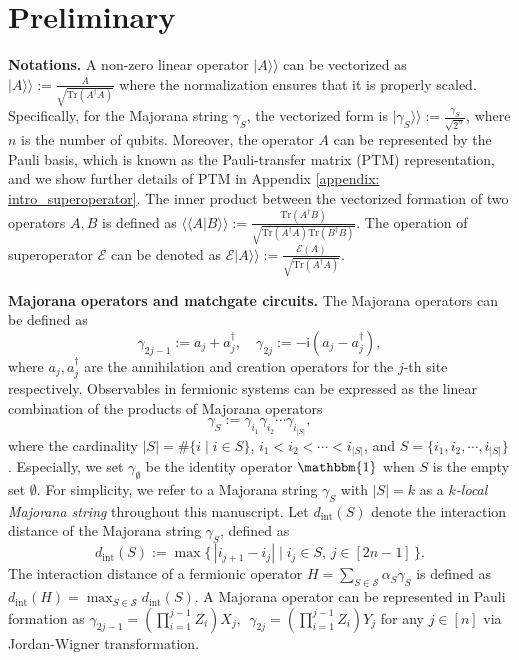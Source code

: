 \documentclass[showpacs,twocolumn,aps,prx,long bibliography,superscriptaddress,notitlepage]{revtex4-1}
\newcommand{\ii}{\mathsf{i}}
\newcommand{\supket}[1]{|#1 \rangle\rangle}
\newcommand{\cbra}[1]{\{ #1 \}}
\newcommand{\supbraket}[1]{\langle\langle #1 \rangle\rangle}
\newcommand{\tra}[1]{\text{Tr}\left( #1 \right)}
\newcommand{\Ecal}{\mathcal{E}}
\newcommand{\Scal}{\mathcal{S}}
\begin{document}
\section{Preliminary}
\label{sec: preliminary}
\noindent\textbf{Notations.} 
 A non-zero linear operator $\supket{A}$ can be vectorized as $\supket{A}:=\frac{A}{\sqrt{\tra{A^\dagger A}}}$ where the normalization ensures that it is properly scaled. 
Specifically, for the Majorana string
$\gamma_S$, the vectorized form is
$\supket{\gamma_S}:=\frac{\gamma_S}{\sqrt{2^n}}$, where $n$ is the number of qubits. Moreover, the operator $A$ can be represented by the Pauli basis, which is known as the Pauli-transfer matrix (PTM) representation, and we show further details of PTM in Appendix \ref{appendix: intro_superoperator}. 
The inner product between the vectorized formation of two operators $A,B$ is defined as $\supbraket{A|B} :=\frac{\tra{A^\dagger B}}{\sqrt{\tra{A^\dagger A} \tra{B^\dagger B}}}$. The operation of superoperator $\Ecal$ can be denoted as $\Ecal\supket{A}:=\frac{\Ecal(A)}{\sqrt{\tra{A^\dagger A}}}$. 


\vspace{8pt}
\noindent\textbf{Majorana operators and matchgate circuits.}
The Majorana operators can be defined as 
\begin{equation}
    \gamma_{2 j-1}:=a_j+a_j^{\dagger}, \quad \gamma_{2 j}:=-\ii\left(a_j-a_j^{\dagger}\right),
    \label{eq: standard Majorana operators}
\end{equation}
where $a_j,a_j^\dagger$ are the annihilation and creation operators for the $j$-th site respectively. 
Observables in fermionic systems can be expressed as the linear combination of the products of Majorana operators~\cite{hackl2021bosonic}
\begin{equation}
    \gamma_S := \gamma_{i_1}\gamma_{i_2}\cdots\gamma_{i_{|S|}},
    \label{eq: gammaS}
\end{equation}
where the cardinality $|S|=\#\cbra{i \mid i\in S}$,  $i_1 < {i_2}< \cdots < i_{|S|}$, and $S = \{i_1 , {i_2}, \cdots , i_{|S|}\}$. Especially, we set $\gamma_\emptyset$ be the identity operator $\mathbbm{1}$ when $S$ is the empty set $\emptyset$. For simplicity, we refer to a Majorana string $\gamma_S$ with $|S| = k$ as a \emph{$k$-local Majorana string} throughout this manuscript.
Let $d_{\text{int}}(S)$ denote the interaction distance of the Majorana string $\gamma_S$, defined as
\begin{equation}
\label{eq: dint def}
d_{\text{int}}(S) := \max\{\,|i_{j+1} - i_{j}| \mid i_j \in S,\, j \in [2n-1]\,\}.
\end{equation}
The interaction distance of a fermionic operator $H = \sum_{S\in\Scal} \alpha_{S} \gamma_{S}$ is defined as $d_{\text{int}}(H) = \max_{S\in \Scal} d_{\text{int}}(S)$.
A Majorana operator can be represented in Pauli formation as $\gamma_{2 j-1}=\left(\prod_{i=1}^{j-1} Z_i\right) X_j, \ \ \gamma_{2 j}=\left(\prod_{i=1}^{j-1} Z_i\right) Y_j$ for any $j\in[n]$ via Jordan-Wigner transformation.
\end{document}
